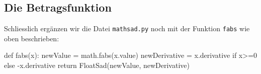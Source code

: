 \documentclass[
  a4paper,
  DIV=11]{scrreprt}
\newenvironment{Shaded}{\begin{snugshade}}{\end{snugshade}}
\newcommand{\ControlFlowTok}[1]{\textcolor[rgb]{0.00,0.23,0.31}{#1}}
\newcommand{\DecValTok}[1]{\textcolor[rgb]{0.68,0.00,0.00}{#1}}
\newcommand{\KeywordTok}[1]{\textcolor[rgb]{0.00,0.23,0.31}{#1}}
\newcommand{\NormalTok}[1]{\textcolor[rgb]{0.00,0.23,0.31}{#1}}
\newcommand{\OperatorTok}[1]{\textcolor[rgb]{0.37,0.37,0.37}{#1}}
\theoremstyle{definition}
\theoremstyle{definition}
\theoremstyle{remark}
\begin{document}
\hypertarget{die-betragsfunktion}{%
\subsection{Die Betragsfunktion}\label{die-betragsfunktion}}

Schliesslich ergänzen wir die Datei \texttt{mathsad.py} noch mit der
Funktion \texttt{fabs} wie oben beschrieben:

\begin{Shaded}
\begin{Highlighting}[]
\KeywordTok{def}\NormalTok{ fabs(x):}
\NormalTok{    newValue }\OperatorTok{=}\NormalTok{ math.fabs(x.value)}
\NormalTok{    newDerivative }\OperatorTok{=}\NormalTok{ x.derivative }\ControlFlowTok{if}\NormalTok{ x}\OperatorTok{\textgreater{}=}\DecValTok{0} \ControlFlowTok{else} \OperatorTok{{-}}\NormalTok{x.derivative}
    \ControlFlowTok{return}\NormalTok{ FloatSad(newValue, newDerivative)}
\end{Highlighting}
\end{Shaded}
\end{document}
